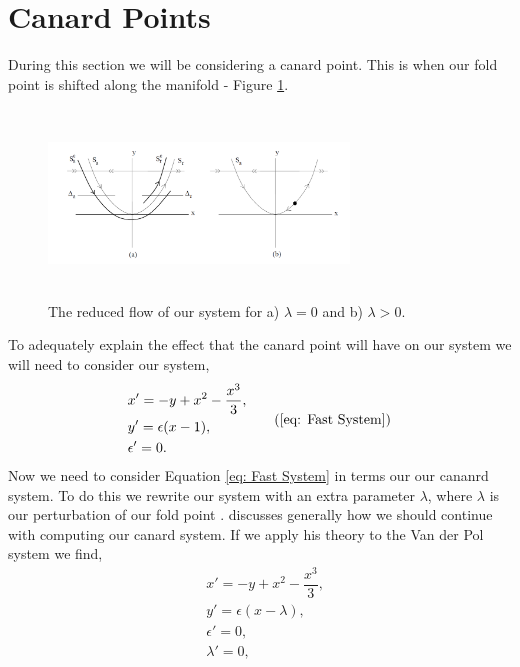 \documentclass{article}
\newcommand{\vdp}{Van der Pol }
\begin{document}
\section{Canard Points}
During this section we will be considering a canard point. This is when our fold point is shifted along the manifold - Figure \ref{fig: Canard Point}. 
\begin{figure}[h!]
    \centering
    \includegraphics[height=5cm,width=8cm]{Canard_Point.png}
    \caption{The reduced flow of our system for a) $\lambda=0$ and b) $\lambda>0$.}
    \label{fig: Canard Point}
\end{figure}
To adequately explain the effect that the canard point will have on our system we will need to consider our system,
\begin{equation}
     \begin{aligned}
        &x'=-y+x^2-\dfrac{x^3}{3},\\
        &y'=\epsilon(x-1),\\
        &\epsilon'=0.\\
     \end{aligned}
    \tag{\ref{eq: Fast System}}
\end{equation}
Now we need to consider Equation \ref{eq: Fast System} in terms our our cananrd system. To do this we rewrite our system with an extra parameter $\lambda$, where $\lambda$ is our perturbation of our fold point \citep{krupa2001}. \citet{krupa2001} discusses generally how we should continue with computing our canard system. If we apply his theory to the \vdp system we find,
\begin{equation}
     \begin{aligned}
        &x'=-y+x^2-\dfrac{x^3}{3},\\
        &y'=\epsilon(x-\lambda),\\
        &\epsilon'=0,\\
         &\lambda'=0,\\
     \end{aligned}
        \label{eq: canard system}
\end{equation}
\end{document}
